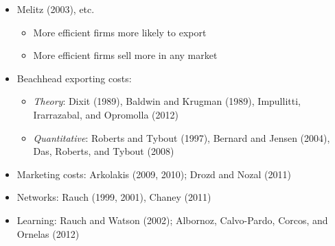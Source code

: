 \documentclass[notes=show]{beamer}
\begin{document}
\begin{frame}%


\begin{itemize}
\item Melitz (2003), etc.

\begin{itemize}
\item More efficient firms more likely to export

\item More efficient firms sell more in any market
\end{itemize}

\item Beachhead exporting costs:

\begin{itemize}
\item \textit{Theory}: Dixit (1989), Baldwin and Krugman (1989), Impullitti,
Irarrazabal, and Opromolla (2012)

\item \textit{Quantitative}: Roberts and Tybout (1997), Bernard and Jensen
(2004), Das, Roberts, and Tybout (2008)
\end{itemize}

\item Marketing costs: Arkolakis (2009, 2010); Drozd and Nozal (2011)

\item Networks: Rauch (1999, 2001), Chaney (2011)

\item Learning: Rauch and Watson (2002); Albornoz, Calvo-Pardo, Corcos, and
Ornelas (2012)
\end{itemize}

\end{frame}%
\end{document}
